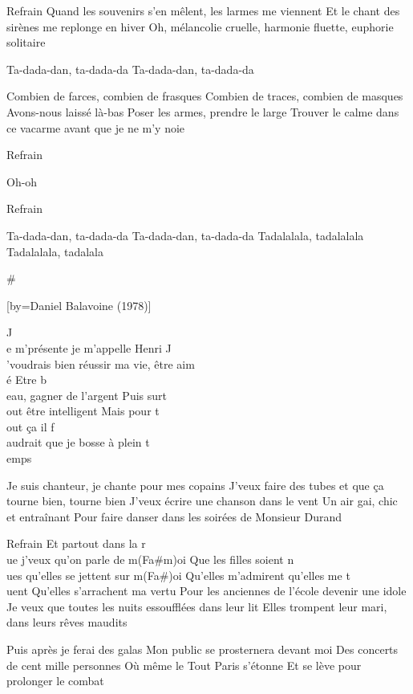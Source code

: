 \beginverse
Refrain
Quand les souvenirs s'en mêlent, les larmes me viennent
Et le chant des sirènes me replonge en hiver
Oh, mélancolie cruelle, harmonie fluette, euphorie solitaire
\endverse

\beginverse
Ta-dada-dan, ta-dada-da
Ta-dada-dan, ta-dada-da
\endverse

\beginverse
Combien de farces, combien de frasques
Combien de traces, combien de masques
Avons-nous laissé là-bas
Poser les armes, prendre le large
Trouver le calme dans ce vacarme avant que je ne m'y noie
\endverse

\beginverse
Refrain
\endverse

\beginverse
Oh-oh
\endverse

\beginverse
Refrain
\endverse

\beginverse
Ta-dada-dan, ta-dada-da
Ta-dada-dan, ta-dada-da
Tadalalala, tadalalala
Tadalalala, tadalala
\endverse

# 

[by={Daniel Balavoine (1978)}]

\beginverse
J\\[La]e m'présente je m'appelle Henri
J\\[La]'voudrais bien réussir ma vie, être aim\\[Mi]é
Etre b\\[Ré]eau, gagner de l'argent
Puis surt\\[Rém]out être intelligent
Mais pour t\\[La]out ça il f\\[Lam]audrait que je bosse à plein t\\[Ré]emps
\endverse

\beginverse
Je suis chanteur, je chante pour mes copains
J'veux faire des tubes et que ça tourne bien, tourne bien
J'veux écrire une chanson dans le vent
Un air gai, chic et entraînant
Pour faire danser dans les soirées de Monsieur Durand
\endverse

	Refrain
Et partout dans la r\\[Ré]ue j'veux qu'on parle de m(Fa\#m)oi
Que les filles soient n\\[Ré]ues qu'elles se jettent sur m(Fa\#)oi
Qu'elles m'admirent qu'elles me t\\[Dodim7]uent
Qu'elles s'arrachent ma vertu
Pour les anciennes de l'école devenir une idole
Je veux que toutes les nuits essoufflées dans leur lit
Elles trompent leur mari, dans leurs rêves maudits

\beginverse
Puis après je ferai des galas
Mon public se prosternera devant moi
Des concerts de cent mille personnes
Où même le Tout Paris s'étonne
Et se lève pour prolonger le combat
\endverse

